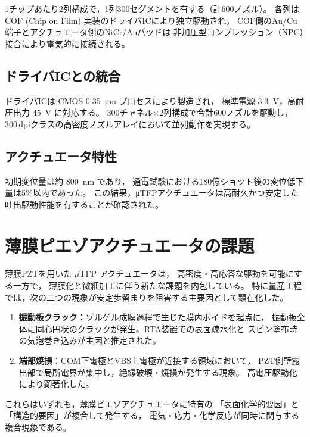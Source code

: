 \documentclass[conference]{IEEEtran}
\begin{document}
1チップあたり2列構成で，1列300セグメントを有する（計600ノズル）。
各列はCOF (Chip on Film) 実装のドライバICにより独立駆動され，
COF側のAu/Cu端子とアクチュエータ側のNiCr/Auパッドは
非加圧型コンプレッション（NPC）接合により電気的に接続される。

\subsection{ドライバICとの統合}
ドライバICは CMOS \SI{0.35}{\micro\metre} プロセスにより製造され，
標準電源 \SI{3.3}{V}，高耐圧出力 \SI{45}{V} に対応する。
300チャネル×2列構成で合計600ノズルを駆動し，
300\,dpiクラスの高密度ノズルアレイにおいて並列動作を実現する。

\subsection{アクチュエータ特性}
初期変位量は約 \SI{800}{nm} であり，
通電試験における180億ショット後の変位低下量は5\%以内であった。
この結果，μTFPアクチュエータは高耐久かつ安定した吐出駆動性能を有することが確認された。

\section{薄膜ピエゾアクチュエータの課題}
薄膜PZTを用いた $\mu$TFP アクチュエータは，
高密度・高応答な駆動を可能にする一方で，
薄膜化と微細加工に伴う新たな課題を内包している。
特に量産工程では，次の二つの現象が安定歩留まりを阻害する主要因として顕在化した。

\begin{enumerate}
  \item \textbf{振動板クラック}：ゾルゲル成膜過程で生じた膜内ボイドを起点に，
  振動板全体に同心円状のクラックが発生。RTA装置での表面疎水化と
  スピン塗布時の気泡巻き込みが主因と推定された。
  \item \textbf{端部焼損}：COM下電極とVBS上電極が近接する領域において，
  PZT側壁露出部で局所電界が集中し，絶縁破壊・焼損が発生する現象。
  高電圧駆動化により顕著化した。
\end{enumerate}

これらはいずれも，薄膜ピエゾアクチュエータに特有の
「表面化学的要因」と「構造的要因」が複合して発生する，
電気・応力・化学反応が同時に関与する複合現象である。

\end{document}
